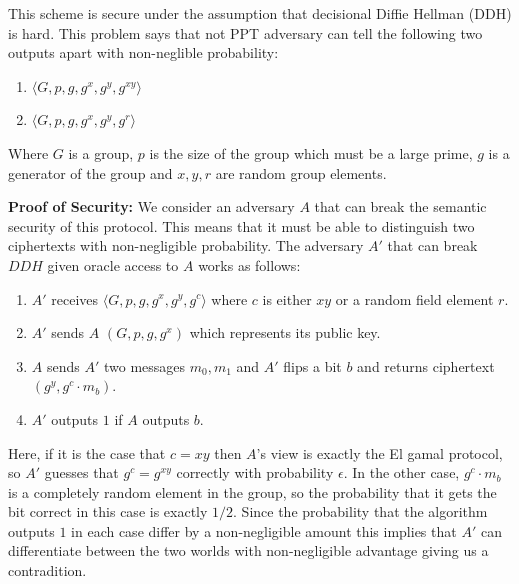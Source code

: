 \documentclass[11pt]{article}
\begin{document}
This scheme is secure under the assumption that decisional Diffie Hellman (DDH) is hard. This problem says that not PPT adversary can tell the following two outputs apart with non-neglible probability:
\begin{enumerate}
    \item $\langle G, p, g, g^x, g^y, g^{xy}\rangle$
    \item $\langle G, p, g, g^x, g^y, g^{r}\rangle$
\end{enumerate}
Where $G$ is a group, $p$ is the size of the group which must be a large prime, $g$ is a generator of the group and $x,y,r$ are random group elements.
\vspace{1em}

\textbf{Proof of Security:} We consider an adversary $A$ that can break the semantic security of this protocol. This means that it must be able to distinguish two ciphertexts with non-negligible probability. The adversary $A'$ that can break $DDH$ given oracle access to $A$ works as follows:
\begin{enumerate}
    \item $A'$ receives $\langle G, p, g, g^x, g^y, g^{c}\rangle$ where $c$ is either $xy$ or a random field element $r$.
    \item $A'$ sends $A$ $(G,p,g,g^x)$ which represents its public key.
    \item $A$ sends $A'$ two messages $m_0,m_1$ and $A'$ flips a bit $b$ and returns ciphertext $(g^y, g^c \cdot m_b)$.
    \item $A'$ outputs $1$ if $A$ outputs $b$.
\end{enumerate}
Here, if it is the case that $c = xy$ then $A$'s view is exactly the El gamal protocol, so $A'$ guesses that $g^c = g^{xy}$ correctly with probability $\epsilon$. In the other case, $g^c \cdot m_b$ is a completely random element in the group, so the probability that it gets the bit correct in this case is exactly $1/2$. Since the probability that the algorithm outputs $1$ in each case differ by a non-negligible amount this implies that $A'$ can differentiate between the two worlds with non-negligible advantage giving us a contradition.
\end{document}
